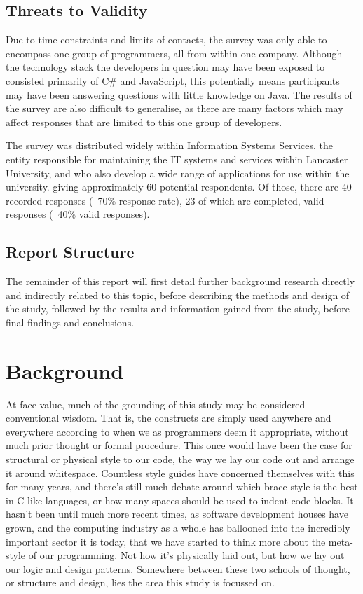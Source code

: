 \documentclass{article}
\begin{document}
    \subsection{Threats to Validity}
        Due to time constraints and limits of contacts, the survey was only able to encompass one group of programmers, all from within one company. Although the technology stack the developers in question may have been exposed to consisted primarily of C\# and JavaScript, this potentially means participants may have been answering questions with little knowledge on Java. The results of the survey are also difficult to generalise, as there are many factors which may affect responses that are limited to this one group of developers.

        The survey was distributed widely within Information Systems Services, the entity responsible for maintaining the IT systems and services within Lancaster University, and who also develop a wide range of applications for use within the university.  giving approximately 60 potential respondents. Of those, there are 40 recorded responses  (~70\% response rate), 23 of which are completed, valid responses (~40\% valid responses).
    \subsection{Report Structure}
        The remainder of this report will first detail further background research directly and indirectly related to this topic, before describing the methods and design of the study, followed by the results and information gained from the study, before final findings and conclusions.
\newpage
\section{Background}
\label{sec:background}
    At face-value, much of the grounding of this study may be considered conventional wisdom. That is, the constructs are simply used anywhere and everywhere according to when we as programmers deem it appropriate, without much prior thought or formal procedure. This once would have been the case for structural or physical style to our code, the way we lay our code out and arrange it around whitespace. Countless style guides have concerned themselves with this for many years, and there's still much debate around which brace style is the best in C-like languages, or how many spaces should be used to indent code blocks. It hasn't been until much more recent times, as software development houses have grown, and the computing industry as a whole has ballooned into the incredibly important sector it is today, that we have started to think more about the meta-style of our programming. Not how it's physically laid out, but how we lay out our logic and design patterns. Somewhere between these two schools of thought, or structure and design, lies the area this study is focussed on.
\end{document}
